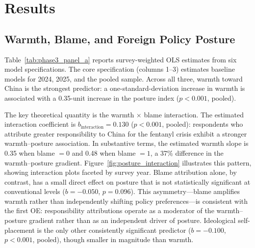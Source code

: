 \documentclass[12pt,letterpaper]{article}
\begin{document}

\section{Results}
\label{sec:results}

\subsection{Warmth, Blame, and Foreign Policy Posture}
\label{sec:results_posture}

Table~\ref{tab:phase3_panel_a} reports survey-weighted OLS estimates from six model specifications. The core specification (columns 1--3) estimates baseline models for 2024, 2025, and the pooled sample. Across all three, warmth toward China is the strongest predictor: a one-standard-deviation increase in warmth is associated with a 0.35-unit increase in the posture index ($p < 0.001$, pooled).

The key theoretical quantity is the warmth $\times$ blame interaction. The estimated interaction coefficient is $b_{\text{interaction}} = 0.130$ ($p < 0.001$, pooled): respondents who attribute greater responsibility to China for the fentanyl crisis exhibit a stronger warmth--posture association. In substantive terms, the estimated warmth slope is 0.35 when blame $= 0$ and 0.48 when blame $= 1$, a 37\% difference in the warmth--posture gradient. Figure~\ref{fig:posture_interaction} illustrates this pattern, showing interaction plots faceted by survey year. Blame attribution alone, by contrast, has a small direct effect on posture that is not statistically significant at conventional levels ($b = -0.050$, $p = 0.096$). This asymmetry---blame amplifies warmth rather than independently shifting policy preferences---is consistent with the first OE: responsibility attributions operate as a moderator of the warmth--posture gradient rather than as an independent driver of posture. Ideological self-placement is the only other consistently significant predictor ($b = -0.100$, $p < 0.001$, pooled), though smaller in magnitude than warmth.
\end{document}

